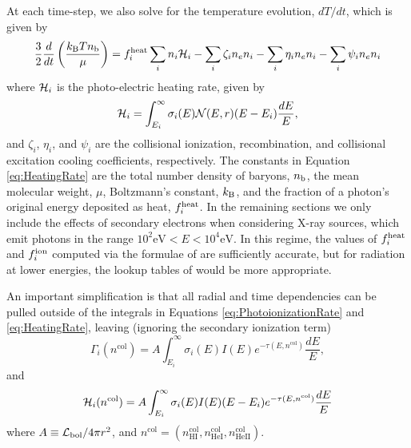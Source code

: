 \documentclass[letterpaper,titlepage,12pt]{article}
\numberwithin{equation}{section}
\begin{document}
At each time-step, we also solve for the temperature evolution, $dT/dt$, which
is given by
\begin{equation}
    \frac{3}{2}\frac{d}{dt}\left(\frac{k_{\text{B}} T n_{\text{b}}}{\mu}\right) = f_i^{\text{heat}} \sum_i n_i \mathcal{H}_i - \sum_i \zeta_i n_e n_i - \sum_i \eta_i n_e n_i - \sum_i \psi_i n_e n_i \label{eq:TemperatureEvolution} 
\end{equation}
where $\mathcal{H}_i$ is the photo-electric heating rate, given by
\begin{equation}
    \mathcal{H}_i = \int_{E_i}^{\infty} \sigma_i(E) \mathcal{N}(E, r)(E - E_i) \frac{dE}{E} \label{eq:HeatingRate} ,
\end{equation}    
and $\zeta_i$, $\eta_i$, and $\psi_i$ are the collisional ionization,
recombination, and collisional excitation cooling coefficients, respectively.
The constants in Equation \ref{eq:HeatingRate} are the total number density of
baryons, $n_{\text{b}}$, the mean molecular weight, $\mu$, Boltzmann's constant, $k_{\text{B}}$,
and the fraction of a photon's original energy deposited as heat, $f_i^{\text{heat}}$. In
the remaining sections we only include the effects of secondary electrons when
considering X-ray sources, which emit photons in the range $10^2\mathrm{eV} <
E < 10^4\mathrm{eV}$. In this regime, the values of $f_i^{\text{heat}}$ and $f_i^{\text{ion}}$
computed via the formulae of \cite{Shull1985} are sufficiently accurate, but
for radiation at lower energies, the lookup tables of \cite{Furlanetto2010}
would be more appropriate.

An important simplification is that all radial and time dependencies can be
pulled outside of the integrals in Equations \ref{eq:PhotoionizationRate} and
\ref{eq:HeatingRate}, leaving (ignoring the secondary ionization term)
\begin{equation}
    \Gamma_i(n^{\mathrm{col}}) = A \int_{E_i}^{\infty} \sigma_i(E) I(E) e^{-\tau(E, n^{\mathrm{col}})} \frac{dE}{E} \label{eq:Gamma_final} ,
\end{equation}
and
\begin{equation}
    \mathcal{H}_i(n^{\mathrm{col}}) = A \int_{E_i}^{\infty} \sigma_i(E) I(E) (E - E_i) e^{-\tau(E, n^{\mathrm{col}})} \frac{dE}{E} \label{eq:Heat_final}
\end{equation}
where $A \equiv \mathcal{L}_{\text{bol}} / 4 \pi r^2$, and $n^{\mathrm{col}} =
(n_{\mathrm{HI}}^{\mathrm{col}}, n_{\mathrm{HeI}}^{\mathrm{col}},
n_{\mathrm{HeII}}^{\mathrm{col}})$.
\end{document}
